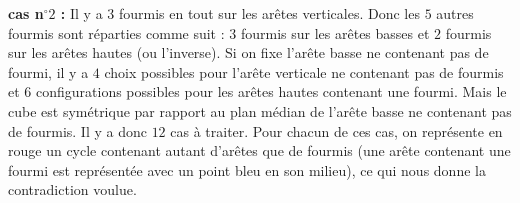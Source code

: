 \begin{center}
\end{center}

\textbf{cas n$^\circ 2$ :} Il y a $3$ fourmis en tout sur les arêtes verticales. Donc les $5$ autres fourmis sont réparties comme suit : $3$ fourmis sur les arêtes basses et $2$ fourmis sur les arêtes hautes (ou l'inverse). Si on fixe l'arête basse ne contenant pas de fourmi, il y a $4$ choix possibles pour l'arête verticale ne contenant pas de fourmis et $6$ configurations possibles pour les arêtes hautes contenant une fourmi. Mais le cube est symétrique par rapport au plan médian de l'arête basse ne contenant pas de fourmis. Il y a donc $12$ cas à traiter.
Pour chacun de ces cas, on représente en rouge un cycle contenant autant d'arêtes que de fourmis (une arête contenant une fourmi est représentée avec un point bleu en son milieu), ce qui nous donne la contradiction voulue.

